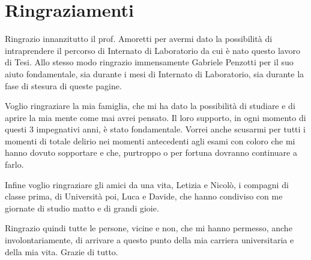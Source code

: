 \chapter*{Ringraziamenti}

Ringrazio innanzitutto il prof. Amoretti per avermi dato la possibilità di intraprendere il percorso di Internato di Laboratorio da cui è nato questo lavoro di Tesi. Allo stesso modo ringrazio immensamente Gabriele Penzotti per il suo aiuto fondamentale, sia durante i mesi di Internato di Laboratorio, sia durante la fase di stesura di queste pagine.

Voglio ringraziare la mia famiglia, che mi ha dato la possibilità di studiare e di aprire la mia mente come mai avrei pensato. Il loro supporto, in ogni momento di questi 3 impegnativi anni, è stato fondamentale. Vorrei anche scusarmi per tutti i momenti di totale delirio nei momenti antecedenti agli esami con coloro che mi hanno dovuto sopportare e che, purtroppo o per fortuna dovranno continuare a farlo.

Infine voglio ringraziare gli amici da una vita, Letizia e Nicolò, i compagni di classe prima, di Università poi, Luca e Davide, che hanno condiviso con me giornate di studio matto e di grandi gioie. 

Ringrazio quindi tutte le persone, vicine e non, che mi hanno permesso, anche involontariamente, di arrivare a questo punto della mia carriera universitaria e della mia vita. Grazie di tutto.